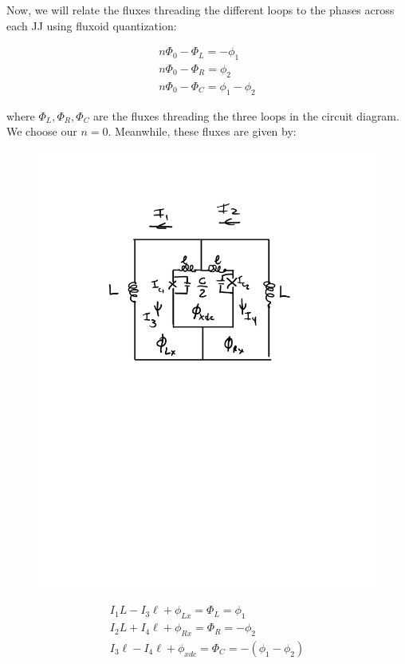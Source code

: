 \documentclass[paper=a4, twocolumn, fontsize=10pt]{article} %
\numberwithin{equation}{section} %
\numberwithin{figure}{section} %
\numberwithin{table}{section} %
\begin{document}
Now, we will relate the fluxes threading the different loops to the phases across each JJ using fluxoid quantization:

\begin{align}
     n\Phi_0 - \Phi_L = -\phi_1
    \\ 
    n \Phi_0 -  \Phi_R = \phi_2
    \\
    n \Phi_0 - \Phi_{C} = \phi_1  - \phi_2
\end{align}

where $\Phi_L, \Phi_R, \Phi_{C}$ are the fluxes threading the three loops in the circuit diagram. We choose our $n=0$. Meanwhile, these fluxes are given by:

\begin{figure}[H]
\centering
\includegraphics[scale=.5]{circuit_diagram.pdf}
\end{figure}

\begin{align}
    I_1 L - I_3 \ell + \phi_{Lx} = \Phi_{L} = \phi_1
    \\
    I_2 L + I_4 \ell + \phi_{Rx} = \Phi_{R} = -\phi_2
    \\
    I_3 \ell - I_4 \ell + \phi_{xdc} = \Phi_{C} = -(\phi_1 - \phi_2)
\end{align} 
\end{document}
